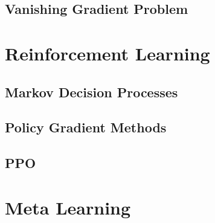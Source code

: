 \subsection{Vanishing Gradient Problem}
\section{Reinforcement Learning}
\subsection{Markov Decision Processes}
\subsection{Policy Gradient Methods}
\subsection{PPO}
\section{Meta Learning}